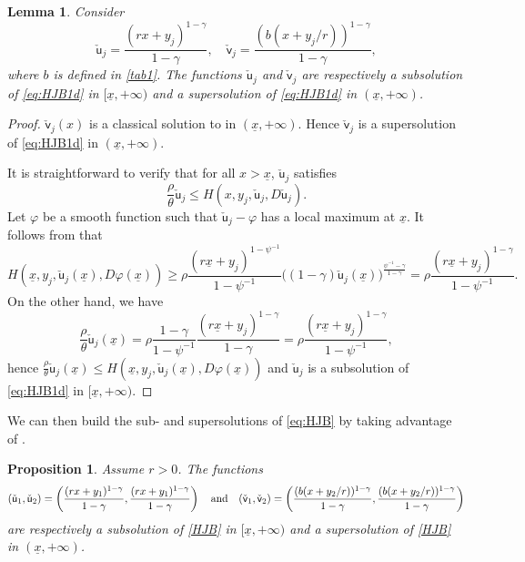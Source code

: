 \documentclass[11pt]{article}
\numberwithin{equation}{section}
\newtheorem{lemma}[thm]{Lemma}
\newtheorem{prop}[thm]{Proposition}
\theoremstyle{definition}
\def\su{{\mathsf{u}}}
\def\sv{{\mathsf{v}}}
\newcommand{\ux}{{\underline x}}
\newcommand{\beq}{\begin{equation}}
\newcommand{\eeq}{\end{equation}}
\newcommand{\g}{\gamma}
\newcommand{\p}{\psi}
\newcommand{\lc}{\left(}
\newcommand{\rc}{\right)}
\theoremstyle{plain}
\begin{document}
\begin{lemma}\label{prop:sub super sol}
Consider
\beq\label{Def:b}
\check{\su}_j=\frac{(rx+y_j)^{1-\gamma}}{1-\gamma},\quad \check{\sv}_j=\frac{(b(x+y_j/r))^{1-\gamma}}{1-\gamma},
\eeq
where $b$ is defined in \cref{tab1}. The functions $\check{\su}_j$ and $\check{\sv}_j$ are respectively a subsolution of \eqref{eq:HJB1d} in $[\ux,+\infty)$ and a supersolution of \eqref{eq:HJB1d} in $(\ux,+\infty)$.
\end{lemma}
\begin{proof}
$\check{\sv}_j(x)$ is a classical solution to  in $(\ux,+\infty)$. Hence $\check{\sv}_j$ is a supersolution of \eqref{eq:HJB1d} in $(\ux,+\infty)$. \par
It is straightforward to verify that for all $x>\ux$, $\check{\su}_j$ satisfies 
$$
\frac{\rho}{\theta} \check{\su}_j\leq H(x, y_j, \check{\su}_j,D\check{\su}_j).
$$
Let $\varphi$ be a smooth function such that $\check{\su}_j-\varphi$ has a local maximum at $\ux$. It follows from  that
$$
H(\ux, y_j, \check{\su}_j(\ux),D\varphi(\ux))\geq \rho\frac{(r\ux+y_j)^{1-\p^{-1}}}{1-\p^{-1}}\big((1-\g)\check{\su}_j(\ux)\big)^{\frac{\p^{-1}-\g}{1-\g}}=\rho \frac{(r\ux+y_j)^{1-\g}}{1-\p^{-1}}.
$$
On the other hand, we have 
$$
\frac{\rho}{\theta} \check{\su}_j(\ux)=\rho \frac{1-\g}{1-\p^{-1}}\frac{(r\ux+y_j)^{1-\g}}{1-\g}=\rho \frac{(r\ux+y_j)^{1-\g}}{1-\p^{-1}},
$$
hence $\frac{\rho}{\theta} \check{\su}_j(\ux)\leq H(\ux, y_j, \check{\su}_j(\ux),D\varphi(\ux))$ and $\check{\su}_j$ is a subsolution of \eqref{eq:HJB1d} in $[\ux,+\infty)$. 
\end{proof}
We can then build the {}{sub- and supersolutions} of \eqref{eq:HJB} by taking advantage of . 
\begin{prop}\label{Prop:sub-super}
Assume $r>0$. The functions 
$$
{}{(\check{\su}_1,\check{\su}_2)}=\lc \frac{(rx+y_1)^{1-\gamma}}{1-\gamma}, \frac{(rx+y_1)^{1-\gamma}}{1-\gamma}\rc\quad {\rm{and}}\quad {}{(\check{\sv}_1,\check{\sv}_2)}=\lc \frac{(b(x+y_2/r))^{1-\gamma}}{1-\gamma},\frac{(b(x+y_2/r))^{1-\gamma}}{1-\gamma}\rc
$$
 are respectively a subsolution of \eqref{HJB} in $[\ux,+\infty)$ and a supersolution of \eqref{HJB} in $(\ux,+\infty)$.
\end{prop}
\end{document}
